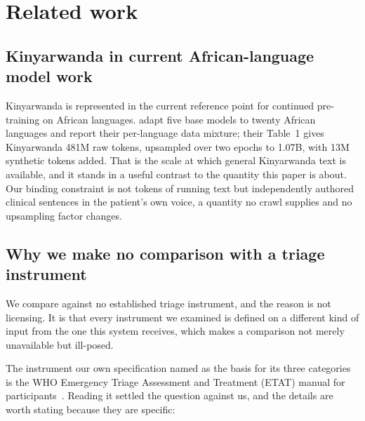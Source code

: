%

\section{Related work}
\label{sec:related}

\subsection{Kinyarwanda in current African-language model work}
\label{sec:related:afriquellm}

Kinyarwanda is represented in the current reference point for continued
pre-training on African languages. \citet{yu2026afriquellm} adapt five base
models to twenty African languages and report their per-language data mixture;
their Table~1 gives Kinyarwanda 481M raw tokens, upsampled over two epochs to
1.07B, with 13M synthetic tokens added. That is the scale at which general
Kinyarwanda text is available, and it stands in a useful contrast to the
quantity this paper is about. Our binding constraint is not tokens of running
text but \SeedFloor{} independently authored clinical sentences in the patient's
own voice, a quantity no crawl supplies and no upsampling factor changes.

\subsection{Why we make no comparison with a triage instrument}
\label{sec:related:instruments}

We compare against no established triage instrument, and the reason is not
licensing. It is that every instrument we examined is defined on a different kind
of input from the one this system receives, which makes a comparison not merely
unavailable but ill-posed.

The instrument our own specification named as the basis for its three categories
is the WHO Emergency Triage Assessment and Treatment (ETAT) manual for
participants~\cite{who2005etat}. Reading it settled the question
against us, and the details are worth stating because they are specific:

